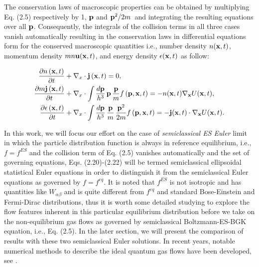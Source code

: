 \documentclass{rsproca}%
\begin{document}
The conservation laws of macroscopic properties can be obtained by multiplying Eq. (2.5) respectively by 1, ${\bf p}$ and \({\bf p}^2/2m\)\, and integrating the resulting equations over all ${\bf p}$.  Consequently, the integrals of the collision terms in all three cases vanish automatically resulting in the conservation laws in differential equations form for the conserved macroscopic quantities i.e., number density \(n({\bf x},t)\), momentum density \(m n {\bf u}({\bf x},t)\), and energy density \(\epsilon({\bf x},t)\) as follow:

\begin{align}
\frac{\partial n\left({\bf x},t\right)}{\partial t}&+{\bf \nabla }_x\cdot{\bf j}\left({\bf x},t\right)=0, \\
\frac{\partial m\/{\bf j}\left({\bf x},t\right)}{\partial t}&+{\bf \nabla }_x\cdot\int{\frac{d{\bf p}}{h^3}}\,{\bf p}\,\frac{\bf p}{m}f\left({\bf p},{\bf x},t\right)= -n({\bf x},t){\bf \nabla}_{\bf x}U({\bf x},t), \\
\frac{\partial \epsilon \left({\bf x},t\right)}{\partial t}&+{\bf \nabla }_x\cdot\int{\frac{d\bf p}{h^3}}\,\frac{\bf p}{m}\,\frac{{\bf p}^2}{2m}f\left({\bf p},{\bf x},t\right)=-{\bf j}({\bf x},t)\cdot{\bf \nabla}_{\bf x}U({\bf x},t).
\end{align}

In this work, we will focus our effort on the case of {\em semiclassical ES Euler} limit in which the particle distribution function is always in reference equilibrium, i.e., $f=f^{ES}$ and the collision term of Eq. (2.5) vanishes automatically and the set of governing equations, Eqs. (2.20)-(2.22) will be termed semiclassical ellipsoidal statistical Euler equations in order to distinguish it from the semiclassical Euler equations as governed by $f=f^{eq}$.  It is noted that $f^{ES}$ is not isotropic and has quantities like $W_{\alpha \beta}$ and is quite different from $f^{eq}$ and standard Bose-Einstein and Fermi-Dirac distributions, thus it is worth some detailed studying to explore the flow features inherent in this particular equilibrium distribution before we take on the non-equilibrium gas flows as governed by semiclassical Boltzmann-ES-BGK equation, i.e., Eq. (2.5). In the later section, we will present the comparison of results with these two semiclassical Euler solutions.  In recent years, notable numerical methods to describe the ideal quantum gas flows have been developed, see \cite{1272832,Shi20089389,Jaw-YenYang05082006}.
\end{document}
